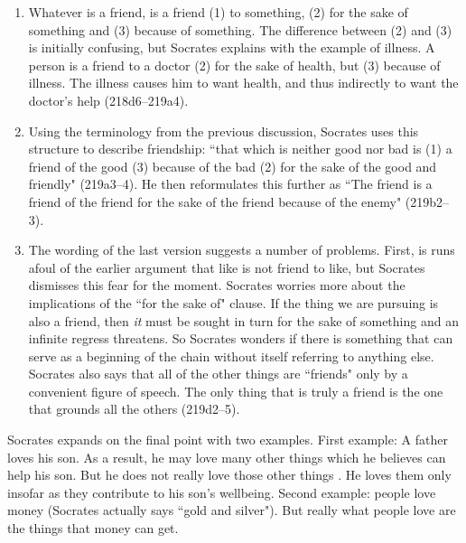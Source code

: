 \documentclass[11pt]{article}
\begin{document}
\begin{enumerate}

    \item Whatever is a friend, is a friend (1) to something, (2) for the
        sake of something and (3) because of something.  The difference
        between (2) and (3) is initially confusing, but Socrates explains
        with the example of illness.  A person is a friend to a doctor (2)
        for the sake of health, but (3) because of illness.  The illness
        causes him to want health, and thus indirectly to want the doctor's
        help (218d6--219a4).

    \item Using the terminology from the previous discussion, Socrates uses
        this structure to describe friendship: ``that which is neither good
        nor bad is (1) a friend of the good (3) because of the bad (2) for
        the sake of the good and friendly" (219a3--4).  He then
        reformulates this further as ``The friend is a friend of the friend
        for the sake of the friend because of the enemy" (219b2--3).

    \item The wording of the last version suggests a number of problems.
        First, is runs afoul of the earlier argument that like is not
        friend to like, but Socrates dismisses this fear for the moment.
        Socrates worries more about the implications of the ``for the sake
        of" clause.  If the thing we are pursuing is also a friend, then
        \emph{it} must be sought in turn for the sake of something and an
        infinite regress threatens.  So Socrates wonders if there is
        something that can serve as a beginning of the chain without itself
        referring to anything else.  Socrates also says that all of the
        other things are ``friends" only by a convenient figure of speech.
        The only thing that is truly a friend is the one that grounds all
        the others (219d2--5).

\end{enumerate}

Socrates expands on the final point with two examples.  First example: A father
loves his son.  As a result, he may love many other things which he believes
can help his son.  But he does not really love those other things . He loves them only insofar as they contribute to his son's wellbeing.
Second example: people love money (Socrates actually says ``gold and silver").
But really what people love are the things that money can get.
\end{document}
